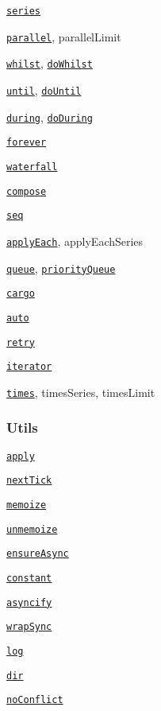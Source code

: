 \begin{DoxyItemize}
\item \href{#seriestasks-callback}{\tt {\ttfamily series}}
\item \href{#parallel}{\tt {\ttfamily parallel}}, {\ttfamily parallel\+Limit}
\item \href{#whilst}{\tt {\ttfamily whilst}}, \href{#doWhilst}{\tt {\ttfamily do\+Whilst}}
\item \href{#until}{\tt {\ttfamily until}}, \href{#doUntil}{\tt {\ttfamily do\+Until}}
\item \href{#during}{\tt {\ttfamily during}}, \href{#doDuring}{\tt {\ttfamily do\+During}}
\item \href{#forever}{\tt {\ttfamily forever}}
\item \href{#waterfall}{\tt {\ttfamily waterfall}}
\item \href{#compose}{\tt {\ttfamily compose}}
\item \href{#seq}{\tt {\ttfamily seq}}
\item \href{#applyEach}{\tt {\ttfamily apply\+Each}}, {\ttfamily apply\+Each\+Series}
\item \href{#queue}{\tt {\ttfamily queue}}, \href{#priorityQueue}{\tt {\ttfamily priority\+Queue}}
\item \href{#cargo}{\tt {\ttfamily cargo}}
\item \href{#auto}{\tt {\ttfamily auto}}
\item \href{#retry}{\tt {\ttfamily retry}}
\item \href{#iterator}{\tt {\ttfamily iterator}}
\item \href{#times}{\tt {\ttfamily times}}, {\ttfamily times\+Series}, {\ttfamily times\+Limit}
\end{DoxyItemize}

\subsubsection*{Utils}


\begin{DoxyItemize}
\item \href{#apply}{\tt {\ttfamily apply}}
\item \href{#nextTick}{\tt {\ttfamily next\+Tick}}
\item \href{#memoize}{\tt {\ttfamily memoize}}
\item \href{#unmemoize}{\tt {\ttfamily unmemoize}}
\item \href{#ensureAsync}{\tt {\ttfamily ensure\+Async}}
\item \href{#constant}{\tt {\ttfamily constant}}
\item \href{#asyncify}{\tt {\ttfamily asyncify}}
\item \href{#wrapSync}{\tt {\ttfamily wrap\+Sync}}
\item \href{#log}{\tt {\ttfamily log}}
\item \href{#dir}{\tt {\ttfamily dir}}
\item \href{#noConflict}{\tt {\ttfamily no\+Conflict}}
\end{DoxyItemize}

